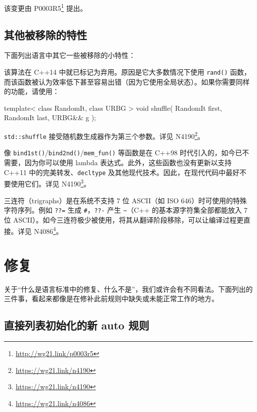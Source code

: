 \begin{myInfoBox}
该变更由 P0003R5\footnote{\url{http://wg21.link/p0003r5}} 提出。
\end{myInfoBox}

\subsection{其他被移除的特性}

下面列出语言中其它一些被移除的小特性：


该算法在 C++14 中就已标记为弃用。原因是它大多数情况下使用 \texttt{rand()} 函数，而该函数被认为效率低下甚至容易出错（因为它使用全局状态）。如果你需要同样的功能，请使用：

\begin{codebox}[cpp]
template< class RandomIt, class URBG >
void shuffle( RandomIt first, RandomIt last, URBG&& g );
\end{codebox}

\texttt{std::shuffle} 接受随机数生成器作为第三个参数。详见 N4190\footnote{\url{https://wg21.link/n4190}}。


像 \texttt{bind1st()}/\texttt{bind2nd()}/\texttt{mem\_fun()} 等函数是在 C++98 时代引入的，如今已不需要，因为你可以使用 lambda 表达式。此外，这些函数也没有更新以支持 C++11 中的完美转发、\texttt{decltype} 及其他现代技术。因此，在现代代码中最好不要使用它们。详见 N4190\footnote{\url{https://wg21.link/n4190}}。


三连符（trigraphs）是在系统不支持 7 位 ASCII（如 ISO 646）时可使用的特殊字符序列。例如 \texttt{??=} 生成 \texttt{\#}，\texttt{??-} 产生 \texttt{\textasciitilde}（C++ 的基本源字符集全部都能放入 7 位 ASCII）。如今三连符极少被使用，将其从翻译阶段移除，可以让编译过程更直接。详见 N4086\footnote{\url{https://wg21.link/n4086}}。

\section{修复}

关于“什么是语言标准中的修复、什么不是”，我们或许会有不同看法。下面列出的三件事，看起来都像是在修补此前规则中缺失或未能正常工作的地方。

\subsection{直接列表初始化的新 auto 规则}

